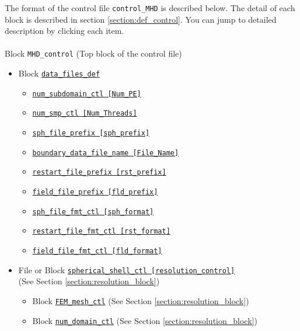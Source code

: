 The format of the control file \verb|control_MHD| is described below. The detail of each block is described in section \ref{section:def_control}. You can jump to detailed description by clicking each item. \\
\\
%
Block \verb|MHD_control|  (Top block of the control file)
\label{href_i:MHD_control}
%
\begin{itemize}
\item Block \hyperref[href_t:data_files_def]{\tt data\_files\_def}
	\label{href_i:data_files_def}
%
	\begin{itemize}
	\item \hyperref[href_t:num_subdomain_ctl]
			{\tt num\_subdomain\_ctl    [Num\_PE]}
	\item \hyperref[href_t:num_smp_ctl]
			{\tt num\_smp\_ctl    [Num\_Threads]}
	\item \hyperref[href_t:sph_file_prefix]
			{\tt sph\_file\_prefix    [sph\_prefix]}
	\item \hyperref[href_t:boundary_data_file_name]
		{\tt boundary\_data\_file\_name    [File\_Name]}
%
	\item \hyperref[href_t:restart_file_prefix]
		{\tt restart\_file\_prefix    [rst\_prefix]}
	\item \hyperref[href_t:field_file_prefix]
			{\tt field\_file\_prefix    [fld\_prefix]}
%
	\item \hyperref[href_t:sph_file_fmt_ctl]
			{\tt sph\_file\_fmt\_ctl    [sph\_format]}
	\item \hyperref[href_t:restart_file_fmt_ctl]
			{\tt restart\_file\_fmt\_ctl    [rst\_format]}
	\item \hyperref[href_t:field_file_fmt_ctl]
			{\tt field\_file\_fmt\_ctl    [fld\_format]}
	\end{itemize}
%
\item File or Block \hyperref[href_i:spherical_shell_ctl]
			{\tt spherical\_shell\_ctl        [resolution\_control]}  \\
			 (See Section \ref{section:resolution_block})
	\begin{itemize}
	\item Block \hyperref[href_i:FEM_mesh_ctl]
        {\tt FEM\_mesh\_ctl} (See Section \ref{section:resolution_block})
	\item Block \hyperref[href_i:num_domain_ctl]
		{\tt num\_domain\_ctl} (See Section \ref{section:resolution_block})

\end{itemize}
\end{itemize}
